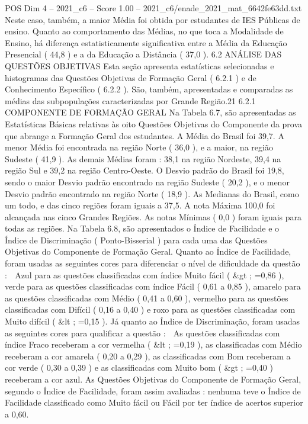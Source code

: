 \begin{textsample}{POS Dim 4 – 2021\_c6 – Score 1.00 – 2021\_c6/enade\_2021\_mat\_6642fe63dd.txt}
Neste caso, também, a maior Média foi obtida por estudantes de IES Públicas de ensino.
Quanto ao comportamento das Médias, no que toca a Modalidade de Ensino, há diferença estatisticamente significativa entre a Média da Educação Presencial ( 44,8 ) e a da Educação a Distância ( 37,0 ). 6.2 ANÁLISE DAS QUESTÕES OBJETIVAS Esta seção apresenta estatísticas selecionadas e histogramas das Questões Objetivas de Formação Geral ( 6.2.1 ) e de Conhecimento Específico ( 6.2.2 ).
São, também, apresentadas e comparadas as médias das subpopulações caracterizadas por Grande Região.21 6.2.1 COMPONENTE DE FORMAÇÃO GERAL Na Tabela 6.7, são apresentadas as Estatísticas Básicas relativas às oito Questões Objetivas do Componente da prova que abrange a Formação Geral dos estudantes.
A Média do Brasil foi 39,7.
A menor Média foi encontrada na região Norte ( 36,0 ), e a maior, na região Sudeste ( 41,9 ).
As demais Médias foram : 38,1 na região Nordeste, 39,4 na região Sul e 39,2 na região Centro-Oeste.
O Desvio padrão do Brasil foi 19,8, sendo o maior Desvio padrão encontrado na região Sudeste ( 20,2 ), e o menor Desvio padrão encontrado na região Norte ( 18,9 ).
As Medianas do Brasil, como um todo, e das cinco regiões foram iguais a 37,5.
A nota Máxima 100,0 foi alcançada nas cinco Grandes Regiões.
As notas Mínimas ( 0,0 ) foram iguais para todas as regiões.
Na Tabela 6.8, são apresentados o Índice de Facilidade e o Índice de Discriminação ( Ponto-Bisserial ) para cada uma das Questões Objetivas do Componente de Formação Geral.
Quanto ao Índice de Facilidade, foram usadas as seguintes cores para diferenciar o nível de dificuldade da questão :  Azul para as questões classificadas com índice Muito fácil ( \&gt ; =0,86 ), verde para as questões classificadas com índice Fácil ( 0,61 a 0,85 ), amarelo para as questões classificadas com Médio ( 0,41 a 0,60 ), vermelho para as questões classificadas com Difícil ( 0,16 a 0,40 ) e roxo para as questões classificadas com Muito difícil ( \&lt ; =0,15 ).
Já quanto ao Índice de Discriminação, foram usadas as seguintes cores para qualificar a questão :  As questões classificadas com índice Fraco receberam a cor vermelha ( \&lt ; =0,19 ), as classificadas com Médio receberam a cor amarela ( 0,20 a 0,29 ), as classificadas com Bom receberam a cor verde ( 0,30 a 0,39 ) e as classificadas com Muito bom ( \&gt ; =0,40 ) receberam a cor azul.
As Questões Objetivas do Componente de Formação Geral, segundo o Índice de Facilidade, foram assim avaliadas : nenhuma teve o Índice de Facilidade classificado como Muito fácil ou Fácil por ter índice de acertos superior a 0,60.

\end{textsample}
